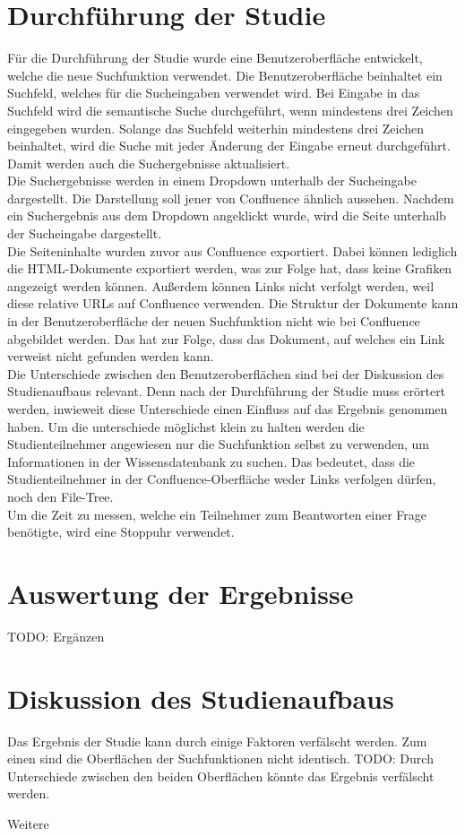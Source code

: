 \section{Durchführung der Studie}
Für die Durchführung der Studie wurde eine Benutzeroberfläche entwickelt, welche die neue Suchfunktion verwendet.
Die Benutzeroberfläche beinhaltet ein Suchfeld, welches für die Sucheingaben verwendet wird.
Bei Eingabe in das Suchfeld wird die semantische Suche durchgeführt, wenn mindestens drei Zeichen eingegeben wurden.
Solange das Suchfeld weiterhin mindestens drei Zeichen beinhaltet, wird die Suche mit jeder Änderung der Eingabe erneut durchgeführt.
Damit werden auch die Suchergebnisse aktualisiert.\\

Die Suchergebnisse werden in einem Dropdown unterhalb der Sucheingabe dargestellt.
Die Darstellung soll jener von Confluence ähnlich aussehen.
Nachdem ein Suchergebnis aus dem Dropdown angeklickt wurde, wird die Seite unterhalb der Sucheingabe dargestellt.\\

Die Seiteninhalte wurden zuvor aus Confluence exportiert.
Dabei können lediglich die HTML-Dokumente exportiert werden, was zur Folge hat, dass keine Grafiken angezeigt werden können.
Außerdem können Links nicht verfolgt werden, weil diese relative URLs auf Confluence verwenden.
Die Struktur der Dokumente kann in der Benutzeroberfläche der neuen Suchfunktion nicht wie bei Confluence abgebildet werden.
Das hat zur Folge, dass das Dokument, auf welches ein Link verweist nicht gefunden werden kann.\\

Die Unterschiede zwischen den Benutzeroberflächen sind bei der Diskussion des Studienaufbaus relevant.
Denn nach der Durchführung der Studie muss erörtert werden, inwieweit diese Unterschiede einen Einfluss auf das Ergebnis genommen haben.
Um die unterschiede möglichst klein zu halten werden die Studienteilnehmer angewiesen nur die Suchfunktion selbst zu verwenden, um Informationen in der Wissensdatenbank zu suchen.
Das bedeutet, dass die Studienteilnehmer in der Confluence-Oberfläche weder Links verfolgen dürfen, noch den File-Tree.\\

Um die Zeit zu messen, welche ein Teilnehmer zum Beantworten einer Frage benötigte, wird eine Stoppuhr verwendet.
\section{Auswertung der Ergebnisse}
TODO: Ergänzen

\section{Diskussion des Studienaufbaus}

Das Ergebnis der Studie kann durch einige Faktoren verfälscht werden.
Zum einen sind die Oberflächen der Suchfunktionen nicht identisch.
TODO: Durch Unterschiede zwischen den beiden Oberflächen könnte das Ergebnis verfälscht werden. 

Weitere 

